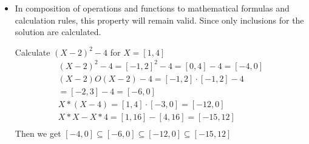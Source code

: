 \begin{itemize}
\begin{itemize}
\begin{itemize}
		\end{itemize}
	\item In composition of operations and functions to mathematical formulas and calculation rules, this property will remain valid. Since only inclusions for the solution are calculated.
	\begin{*example} Calculate $(X-2)^2-4$ for $X=[1,4]$
		\begin{align*} 
			(X-2)^2-4=[-1,2]^2-4=[0,4]-4=[-4,0]\\
			(X-2) O (X-2)-4=[-1,2]\cdot[-1,2]-4\\
			=[-2,3]-4=[-6,0]\\
			X*(X-4)=[1,4]\cdot[-3,0]=[-12,0]\\
			X*X-X*4=[1,16]-[4,16]=[-15,12]\\
		\end{align*}
		Then we get $[-4,0]\subseteq [-6,0] \subseteq [-12,0] \subseteq [-15,12]$ 
	\end{*example}
	\end{itemize}
\end{itemize} 
